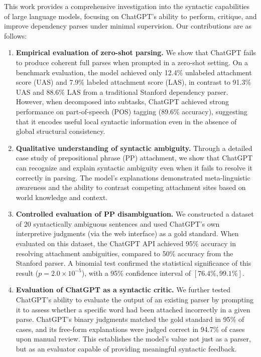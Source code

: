 \label{sec:contributions}

This work provides a comprehensive investigation into the syntactic capabilities of large language models, focusing on ChatGPT’s ability to perform, critique, and improve dependency parses under minimal supervision. Our contributions are as follows:

\begin{enumerate}
    \item \textbf{Empirical evaluation of zero-shot parsing.} We show that ChatGPT fails to produce coherent full parses when prompted in a zero-shot setting. On a benchmark evaluation, the model achieved only 12.4\% unlabeled attachment score (UAS) and 7.9\% labeled attachment score (LAS), in contrast to 91.3\% UAS and 88.6\% LAS from a traditional Stanford dependency parser. However, when decomposed into subtasks, ChatGPT achieved strong performance on part-of-speech (POS) tagging (89.6\% accuracy), suggesting that it encodes useful local syntactic information even in the absence of global structural consistency.

    \item \textbf{Qualitative understanding of syntactic ambiguity.} Through a detailed case study of prepositional phrase (PP) attachment, we show that ChatGPT can recognize and explain syntactic ambiguity even when it fails to resolve it correctly in parsing. The model’s explanations demonstrated meta-linguistic awareness and the ability to contrast competing attachment sites based on world knowledge and context.

    \item \textbf{Controlled evaluation of PP disambiguation.} We constructed a dataset of 20 syntactically ambiguous sentences and used ChatGPT’s own interpretive judgments (via the web interface) as a gold standard. When evaluated on this dataset, the ChatGPT API achieved 95\% accuracy in resolving attachment ambiguities, compared to 50\% accuracy from the Stanford parser. A binomial test confirmed the statistical significance of this result ($p = 2.0 \times 10^{-5}$), with a 95\% confidence interval of $[76.4\%, 99.1\%]$.

    \item \textbf{Evaluation of ChatGPT as a syntactic critic.} We further tested ChatGPT’s ability to evaluate the output of an existing parser by prompting it to assess whether a specific word had been attached incorrectly in a given parse. ChatGPT’s binary judgments matched the gold standard in 95\% of cases, and its free-form explanations were judged correct in 94.7\% of cases upon manual review. This establishes the model’s value not just as a parser, but as an evaluator capable of providing meaningful syntactic feedback.


\end{enumerate}
